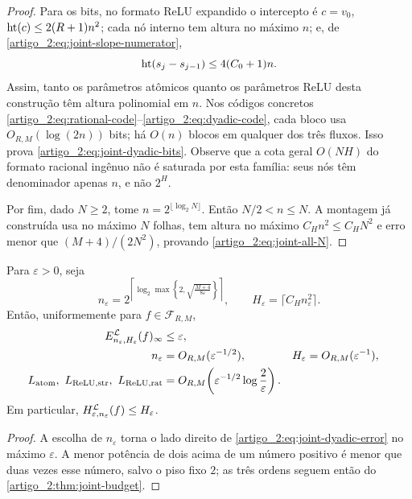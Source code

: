 \begin{proof}
Para os bits, no formato ReLU expandido o intercepto é $c=v_0$,
$\operatorname{ht}(c)\le2(R+1)n^2$; cada nó interno tem altura no máximo $n$; e, de
\eqref{artigo_2:eq:joint-slope-numerator},
\[
 \operatorname{ht}(s_j-s_{j-1})\le4(C_0+1)n.
\]
Assim, tanto os parâmetros atômicos quanto os parâmetros ReLU desta
construção têm altura polinomial em $n$. Nos códigos concretos
\eqref{artigo_2:eq:rational-code}--\eqref{artigo_2:eq:dyadic-code}, cada bloco usa
$O_{R,M}(\log(2n))$ bits; há $O(n)$ blocos em qualquer dos três fluxos. Isso
prova \eqref{artigo_2:eq:joint-dyadic-bits}. Observe que a cota geral
$O(NH)$ do formato racional ingênuo não é saturada por esta família: seus
nós têm denominador apenas $n$, e não $2^H$.

Por fim, dado $N\ge2$, tome $n=2^{\lfloor\log_2N\rfloor}$. Então
$N/2<n\le N$. A montagem já construída usa no máximo $N$ folhas, tem altura
no máximo $C_Hn^2\le C_HN^2$ e erro menor que
$(M+4)/(2N^2)$, provando \eqref{artigo_2:eq:joint-all-N}.
\end{proof}

\begin{corollary}\label{map:artigo_2:3.17}
\label{artigo_2:cor:height-for-epsilon}
Para $\varepsilon>0$, seja
\begin{equation}
 n_\varepsilon
 =2^{\left\lceil\log_2\max\left\{2,
        \sqrt{\frac{M+4}{8\varepsilon}}\right\}\right\rceil},
 \qquad
 H_\varepsilon=\lceil C_Hn_\varepsilon^2\rceil.
 \label{artigo_2:eq:epsilon-schedule}
\end{equation}
Então, uniformemente para $f\in\mathcal F_{R,M}$,
\begin{align}
 E_{n_\varepsilon,H_\varepsilon}^{\mathcal{L}}(f)_\infty
 &\le\varepsilon,\label{artigo_2:eq:epsilon-joint-error}\\
 n_\varepsilon&=O_{R,M}(\varepsilon^{-1/2}),
 &H_\varepsilon&=O_{R,M}(\varepsilon^{-1}),
 \label{artigo_2:eq:epsilon-joint-height}\\
 L_{\rm atom},\ L_{\rm ReLU,str},\ L_{\rm ReLU,rat}
 &=O_{R,M}\!\left(\varepsilon^{-1/2}
                   \log\frac{2}{\varepsilon}\right).
 \label{artigo_2:eq:epsilon-joint-bits}
\end{align}
Em particular,
$H_{\varepsilon,n_\varepsilon}^{\mathcal{L}}(f)\le H_\varepsilon$.
\end{corollary}

\begin{proof}
A escolha de $n_\varepsilon$ torna o lado direito de
\eqref{artigo_2:eq:joint-dyadic-error} no máximo $\varepsilon$. A menor potência de
dois acima de um número positivo é menor que duas vezes esse número, salvo o
piso fixo $2$; as três ordens seguem então do \cref{artigo_2:thm:joint-budget}.
\end{proof}

